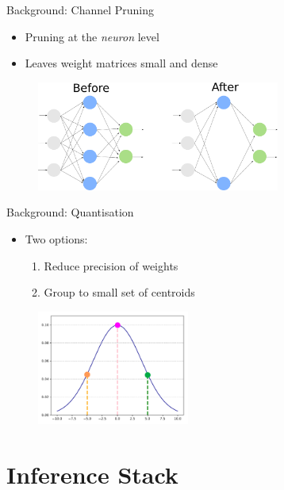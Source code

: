 \documentclass[xcolor=dvipsnames]{beamer}
\begin{document}
\begin{frame}{Background: Channel Pruning}

\begin{itemize}
    \item Pruning at the \textit{neuron} level
    \item Leaves weight matrices small and dense
\end{itemize}

\begin{figure}
    \centering
    \includegraphics[width=8cm]{images/channel_pruning.pdf}
    \label{fig:channel_pruning}
\end{figure}

\end{frame}


\begin{frame}{Background: Quantisation}
\begin{itemize}
    \item Two options:
    \begin{enumerate}
        \item Reduce precision of weights
        \item Group to small set of centroids
    \end{enumerate}
\end{itemize}

\begin{figure}
    \centering
    \includegraphics[width=5cm]{images/quantization.pdf}
\end{figure}


\end{frame}


\section{Inference Stack}
\end{document}
